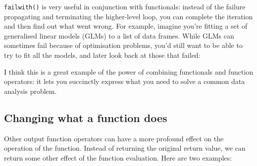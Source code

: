 \texttt{failwith()} is very useful in conjunction with functionals:
instead of the failure propagating and terminating the higher-level
loop, you can complete the iteration and then find out what went wrong.
For example, imagine you're fitting a set of generalised linear models
(GLMs) to a list of data frames. While GLMs can sometimes fail because
of optimisation problems, you'd still want to be able to try to fit all
the models, and later look back at those that failed:

\begin{Shaded}
\begin{Highlighting}[]
\StringTok{ }\OperatorTok{~}\StringTok{ }\OperatorTok{+}\StringTok{ }\OperatorTok{*}\StringTok{ }
\StringTok{ }\NormalTok{(}
  \OperatorTok{~}\StringTok{ }\OperatorTok{+}\StringTok{ }\OperatorTok{*}\StringTok{ }

\StringTok{ }
\StringTok{ }\NormalTok{datasets[}\NormalTok{(}\NormalTok{))]}
\end{Highlighting}
\end{Shaded}

I think this is a great example of the power of combining functionals
and function operators: it lets you succinctly express what you need to
solve a common data analysis problem.

\hypertarget{changing-what-a-function-does}{%
\subsection{Changing what a function
does}\label{changing-what-a-function-does}}

Other output function operators can have a more profound effect on the
operation of the function. Instead of returning the original return
value, we can return some other effect of the function evaluation. Here
are two examples:

